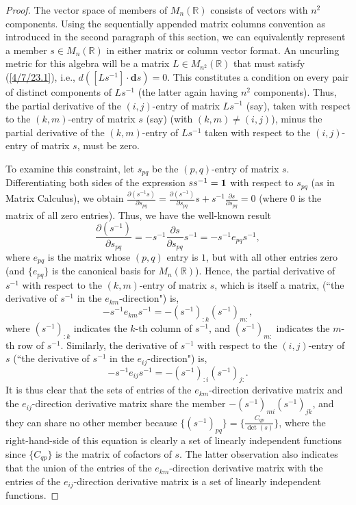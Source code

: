 \documentclass{amsart}
\numberwithin{equation}{section}
\theoremstyle{definition}
\numberwithin{theorem}{section}
\begin{document}
 \begin{proof} The vector space of members of $ M_n(\mathbb{R})$ consists of  vectors with $n^2$ components.   Using the sequentially appended matrix columns convention as introduced in the second paragraph of this section, we can equivalently represent a member $s\in M_n(\mathbb{R})$ in either matrix or column vector format.   An uncurling metric for this algebra will be a matrix $L\in M_{n^2}(\mathbb{R})$ that must satisfy (\ref{4/7/23.1}), i.e., $d\left([Ls^{-1}]\cdot \mathbf{d}s\right)=0$. This constitutes a condition on every pair of distinct components of $Ls^{-1}$ (the latter again having $n^2$ components).  Thus,  the partial derivative of the  $(i,j)$-entry of matrix $Ls^{-1}$ (say), taken with respect to the $(k,m)$-entry of matrix $s$ (say) (with $(k,m)\ne (i,j)$),  minus  the partial derivative of the $(k,m)$-entry of $Ls^{-1}$  taken with respect to the $(i,j)$-entry of matrix $s$, must be zero.
 
 To examine this constraint, let $s_{pq}$ be the $(p,q)$-entry of matrix $s$.   Differentiating both sides of the expression
$ ss^{-1} = {\bf 1}$ with respect to $s_{pq}$ (as in Matrix Calculus), we obtain $\frac{\partial (s^{-1}s)}{\partial s_{pq}} = \frac{\partial (s^{-1})}{\partial s_{pq}}s + s^{-1}\frac{\partial s}{\partial s_{pq}}=0$ (where $0$ is the matrix of all zero entries).  Thus, we have the well-known result 
 \[ \frac{\partial (s^{-1})}{\partial s_{pq}} = -s^{-1}\frac{\partial s}{\partial s_{pq}}s^{-1} = -s^{-1}e_{pq}s^{-1},\]   where $e_{pq}$ is the matrix whose $(p,q)$ entry is $1$, but with all other entries zero (and $\{ e_{pq}\}$ is the canonical basis for $ M_n(\mathbb{R})$).  
 Hence, the partial derivative of $s^{-1}$ with respect to the  $(k,m)$-entry of matrix $s$, which is itself a matrix, (``the derivative of $s^{-1}$ in the $e_{km}$-direction") is, \begin{equation}\label{8/18/22.5} -s^{-1} e_{km}s^{-1} = -(s^{-1})_{:k} (s^{-1})_{m:},\end{equation} where $(s^{-1})_{:k}$ indicates the $k$-th column of $s^{-1}$, and $(s^{-1})_{m:}$ indicates the $m$-th row of $s^{-1}$.    Similarly, the derivative of $s^{-1}$ with respect to the $(i,j)$-entry of $s$ (``the derivative of $s^{-1}$ in the $e_{ij}$-direction")  is, \begin{equation}\label{8/18/22.6} -s^{-1} e_{ij}s^{-1} = -(s^{-1})_{:i} (s^{-1})_{j:}.\end{equation}  It is thus clear that the sets of entries of the $e_{km}$-direction derivative matrix and the $e_{ij}$-direction derivative  matrix share the member  $-(s^{-1})_{mi} (s^{-1})_{jk}$, and they can share no other member because $\{(s^{-1})_{pq}\} = \{\frac{C_{qp}}{\det(s)}\}$, where the right-hand-side of this equation is clearly a set of linearly independent functions since $\{C_{qp}\}$ is the matrix of cofactors of $s$.  The latter observation also indicates that the union of the entries of the $e_{km}$-direction derivative matrix with the entries of the $e_{ij}$-direction derivative matrix is a set of linearly independent functions.


\end{proof}
\end{document}
